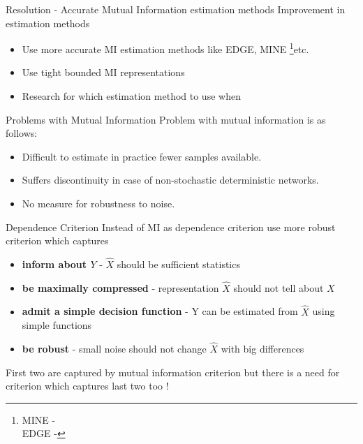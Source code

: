 \documentclass{beamer}
\begin{document}
\begin{frame}{Resolution - Accurate Mutual Information estimation methods}
Improvement in estimation methods
\vspace{5mm}
\begin{itemize}
        \item Use more accurate MI estimation methods like EDGE, MINE \footnote{MINE -  \\ EDGE - }etc.
        \item Use tight bounded MI representations
        \item Research for which estimation method to use when
    \end{itemize}
\end{frame}
\begin{frame}{Problems with Mutual Information}
Problem with mutual information is as follows:
\vspace{5mm}
\begin{itemize}
        \item Difficult to estimate in practice fewer samples available. 
        \item Suffers discontinuity in case of non-stochastic deterministic networks.
        \item No measure for robustness to noise.
    \end{itemize}
\end{frame}
\begin{frame}{Dependence Criterion}
Instead of MI as dependence criterion use more robust criterion which captures
\vspace{5mm}
\begin{itemize}
    \item \textbf{inform about $Y$} - $\hat{X}$ should be sufficient statistics
    \item \textbf{be maximally compressed} - representation $\hat{X}$ should not tell about $X$
    \item \textbf{admit a simple decision function} - Y can be estimated from $\hat{X}$ using simple functions
    \item \textbf{be robust} - small noise should not change $\hat{X}$ with big differences
\end{itemize}
\vspace{5mm}
First two are captured by mutual information criterion but there is a need for criterion which captures last two too !
\end{frame}
\end{document}

